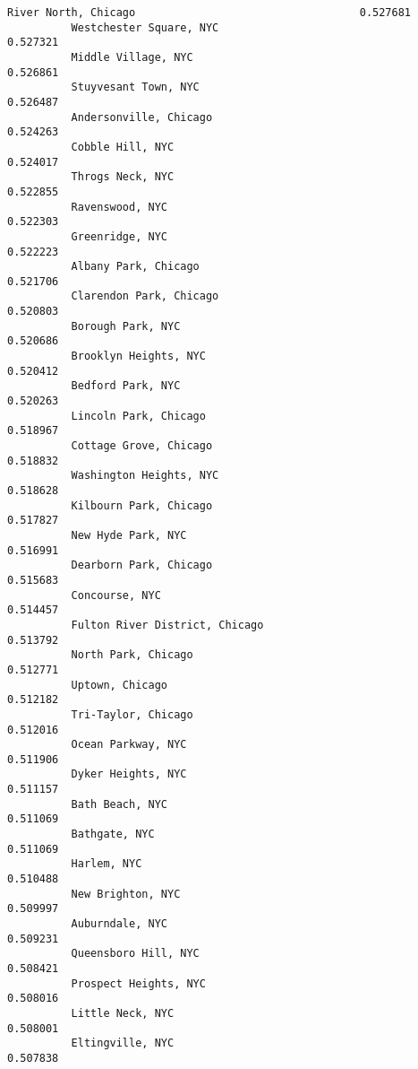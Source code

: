 \documentclass[11pt]{article}
\begin{document}
\begin{Verbatim}[commandchars=\\\{\}]
          River North, Chicago                                   0.527681
          Westchester Square, NYC                                0.527321
          Middle Village, NYC                                    0.526861
          Stuyvesant Town, NYC                                   0.526487
          Andersonville, Chicago                                 0.524263
          Cobble Hill, NYC                                       0.524017
          Throgs Neck, NYC                                       0.522855
          Ravenswood, NYC                                        0.522303
          Greenridge, NYC                                        0.522223
          Albany Park, Chicago                                   0.521706
          Clarendon Park, Chicago                                0.520803
          Borough Park, NYC                                      0.520686
          Brooklyn Heights, NYC                                  0.520412
          Bedford Park, NYC                                      0.520263
          Lincoln Park, Chicago                                  0.518967
          Cottage Grove, Chicago                                 0.518832
          Washington Heights, NYC                                0.518628
          Kilbourn Park, Chicago                                 0.517827
          New Hyde Park, NYC                                     0.516991
          Dearborn Park, Chicago                                 0.515683
          Concourse, NYC                                         0.514457
          Fulton River District, Chicago                         0.513792
          North Park, Chicago                                    0.512771
          Uptown, Chicago                                        0.512182
          Tri-Taylor, Chicago                                    0.512016
          Ocean Parkway, NYC                                     0.511906
          Dyker Heights, NYC                                     0.511157
          Bath Beach, NYC                                        0.511069
          Bathgate, NYC                                          0.511069
          Harlem, NYC                                            0.510488
          New Brighton, NYC                                      0.509997
          Auburndale, NYC                                        0.509231
          Queensboro Hill, NYC                                   0.508421
          Prospect Heights, NYC                                  0.508016
          Little Neck, NYC                                       0.508001
          Eltingville, NYC                                       0.507838

\end{Verbatim}
\end{document}
